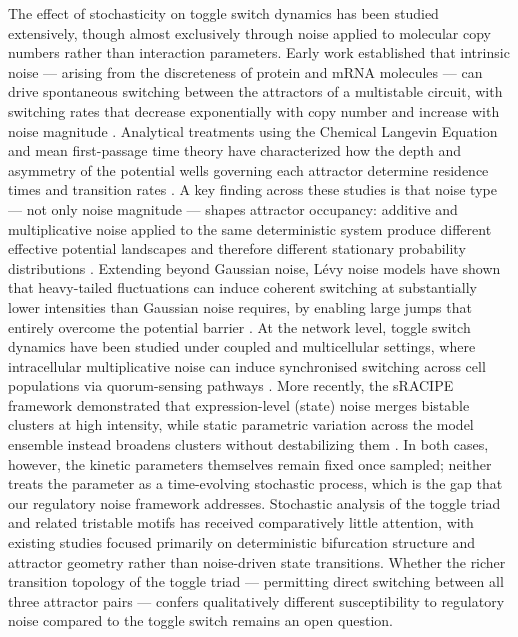 \documentclass[11pt]{article}
\begin{document}
The effect of stochasticity on toggle switch dynamics has been studied extensively, though almost exclusively through noise applied to molecular copy numbers rather than interaction parameters. Early work established that intrinsic noise — arising from the discreteness of protein and mRNA molecules — can drive spontaneous switching between the attractors of a multistable circuit, with switching rates that decrease exponentially with copy number and increase with noise magnitude \cite{tian2006stochastic, Wang2007Noise-inducedSwitch}. Analytical treatments using the Chemical Langevin Equation and mean first-passage time theory have characterized how the depth and asymmetry of the potential wells governing each attractor determine residence times and transition rates \cite{Wang2010TheDifferentiation, Strasser2012StabilityExpression, Xu2014SwitchSwitch}. A key finding across these studies is that noise type — not only noise magnitude — shapes attractor occupancy: additive and multiplicative noise applied to the same deterministic system produce different effective potential landscapes and therefore different stationary probability distributions \cite{Jaruszewicz2013ToggleGene}. Extending beyond Gaussian noise, Lévy noise models have shown that heavy-tailed fluctuations can induce coherent switching at substantially lower intensities than Gaussian noise requires, by enabling large jumps that entirely overcome the potential barrier \cite{Xu2016TheNoise}. At the network level, toggle switch dynamics have been studied under coupled and multicellular settings, where intracellular multiplicative noise can induce synchronised switching across cell populations via quorum-sensing pathways \cite{Wang2007Noise-inducedSwitch}. More recently, the sRACIPE framework demonstrated that expression-level (state) noise merges bistable clusters at high intensity, while static parametric variation across the model ensemble instead broadens clusters without destabilizing them \cite{Kohar2018RoleCircuits}. In both cases, however, the kinetic parameters themselves remain fixed once sampled; neither treats the parameter as a time-evolving stochastic process, which is the gap that our regulatory noise framework addresses. Stochastic analysis of the toggle triad and related tristable motifs has received comparatively little attention, with existing studies focused primarily on deterministic bifurcation structure and attractor geometry \cite{doi:10.1098/rsif.2020.0631, Duddu2025DistinctNetworks} rather than noise-driven state transitions. Whether the richer transition topology of the toggle triad — permitting direct switching between all three attractor pairs — confers qualitatively different susceptibility to regulatory noise compared to the toggle switch remains an open question.
\end{document}
